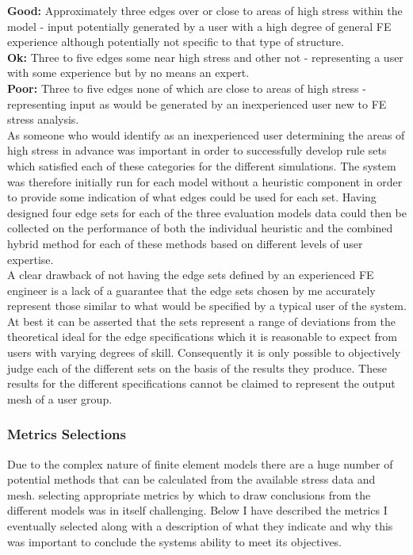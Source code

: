 \noindent
\textbf{Good: } Approximately three edges over or close to areas of high stress within the model - input potentially generated by a user with a high degree of general FE experience although potentially not specific to that type of structure. \\ 

\noindent
\textbf{Ok: } Three to five edges some near high stress and other not - representing a user with some experience but by no means an expert. \\ 

\noindent
\textbf{Poor: } Three to five edges none of which are close to areas of high stress - representing input as would be generated by an inexperienced user new to FE stress analysis. \\ 

\noindent
As someone who would identify as an inexperienced user determining the areas of high stress in advance was important in order to successfully develop rule sets which satisfied each of these categories for the different simulations. The system was therefore initially run for each model without a heuristic component in order to provide some indication of what edges could be used for each set. Having designed four edge sets for each of the three evaluation models data could then be collected on the performance of both the individual heuristic and the combined hybrid method for each of these methods based on different levels of user expertise. \\

\noindent
A clear drawback of not having the edge sets defined by an experienced FE engineer is a lack of a guarantee that the edge sets chosen by me accurately represent those similar to what would be specified by a typical user of the system. At best it can be asserted that the sets represent a range of deviations from the theoretical ideal for the edge specifications which it is reasonable to expect from users with varying degrees of skill. Consequently it is only possible to objectively judge each of the different sets on the basis of the results they produce. These results for the different specifications cannot be claimed to represent the output mesh of a user group.\\ 


\subsubsection{Metrics Selections}

\noindent
Due to the complex nature of finite element models there are a huge number of potential methods that can be calculated from the available stress data and mesh. selecting appropriate metrics by which to draw conclusions from the different models was in itself challenging. Below I have described the metrics I eventually selected along with a description of what they indicate and why this was important to conclude the systems ability to meet its objectives. \\ 

